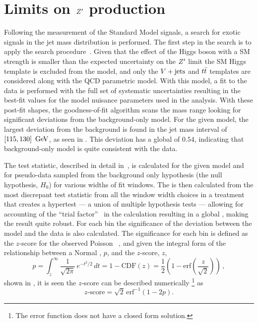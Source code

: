\section{Limits on $Z^{\prime}$ production}

Following the measurement of the Standard Model signals, a search for exotic signals in the \largeR jet mass distribution is performed.
The first step in the search is to apply the \BumpHunter{} search procedure~\cite{Aaltonen:2008vt,Choudalakis:2011qn}.
Given that the effect of the Higgs boson with a SM strength is smaller than the expected uncertainty on the $Z^{\prime}$ limit the SM Higgs template is excluded from the model, and only the $V + \text{jets}$ and $t\bar{t}$ templates are considered along with the QCD parametric model.
With this model, a fit to the data is performed with the full set of systematic uncertainties resulting in the best-fit values for the model nuisance parameters used in the analysis.
With these post-fit shapes, the \BumpHunter{} goodness-of-fit algorithm scans the mass range looking for significant deviations from the background-only model.
For the given model, the largest deviation from the background is found in the \largeR jet mass interval of $\left[115,130\right]~\mathrm{GeV}$, as seen in .
This deviation has a \BumpHunter{} global \pvalue{} of $0.54$, indicating that background-only model is quite consistent with the data.

The \BumpHunter{} test statistic, described in detail in~\cite{Choudalakis:2011qn}, is calculated for the given model and for pseudo-data sampled from the background only hypothesis (the null hypothesis, $H_{0}$) for various widths of fit windows.
The \BumpHunter{} \pvalue{} is then calculated from the most discrepant test statistic from all the window width choices in a treatment that creates a hypertest --- a union of multiple hypothesis tests --- allowing for accounting of the ``trial factor''~\cite{Gross:2010qma} in the calculation resulting in a global \pvalue{}, making the result quite robust.
For each bin the significance of the deviation between the model and the data is also calculated.
The significance for each bin is defined as the $z$-score for the observed Poisson \pvalue{}~\cite{Choudalakis:2012}, and given the integral form of the relationship between a Normal \pvalue{}, $p$, and the $z$-score, $z$,
\[
 p = \int_{z}^{\infty} \frac{1}{\sqrt{2\pi}}\,e^{-t^2/2}\,dt = 1 - \mathrm{CDF}\left(z\right) = \frac{1}{2}\left(1 - \mathrm{erf}\left(\frac{z}{\sqrt{2}}\right)\right)\,,
\]
shown in , it is seen the $z$-score can be described numerically%
\footnote{The error function does not have a closed form solution.}
as
\[
 z\textrm{-score} = \sqrt{2}\, \mathrm{erf}^{-1}\left(1-2p\right).
\]

